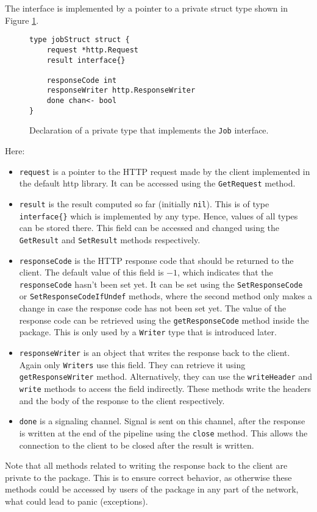 The interface is implemented by a pointer to a private struct type shown in 
Figure \ref{fig:jobStruct}.
\newpage
\begin{figure}[h]
\centering
\begin{lstlisting}
type jobStruct struct {
    request *http.Request
    result interface{}

    responseCode int
    responseWriter http.ResponseWriter
    done chan<- bool
}
\end{lstlisting}
\caption[scale=1.0]{Declaration of a private type that implements the 
\texttt{Job} interface.}
\label{fig:jobStruct}
\end{figure}
Here:
\begin{itemize}
  \item \texttt{request} is a pointer to the HTTP request made by the 
        client implemented in the default http library. It can be accessed
        using the \texttt{GetRequest} method. 

  \item \texttt{result} is the result computed so far (initially \texttt{nil}). This is
        of type \texttt{interface\{\}} which is implemented by any type.
        Hence, values of all types can be stored there. This field can be
        accessed and changed using the \texttt{GetResult} and \texttt{SetResult}
        methods respectively.
  
  \item \texttt{responseCode} is the HTTP response code that should be 
        returned to the client. The default value of this field is $-1$,
        which indicates that the \texttt{responseCode} hasn't been set yet. 
        It can be set using the \texttt{SetResponseCode} or 
        \texttt{SetResponseCodeIfUndef} methods, where the second method only
        makes a change in case the response code has not been set yet. The value
        of the response code can be retrieved using the \texttt{getResponseCode}
        method inside the package. This is only used by a 
        \texttt{Writer} type that is introduced later.

  \item \texttt{responseWriter} is an object that writes the response back 
        to the client. Again only \texttt{Writers} use this field. They
        can retrieve it using \texttt{getResponseWriter} method. 
        Alternatively, they can use the \texttt{write\-Header}
        and \texttt{write} methods to access the field indirectly.
        These methods write the headers and 
        the body of the response to the client respectively.

  \item \texttt{done} is a signaling channel. Signal is sent on this channel,
		after the response is written at the end of the pipeline using the 
        \texttt{close} method. This allows the connection to the client to 
        be closed after the result is written.
\end{itemize}
Note that all methods related to writing the response back to the client
are private to the package. This is to ensure correct behavior, as otherwise
these methods could be accessed by users of the package in any part of the 
network, what could lead to panic (exceptions).

